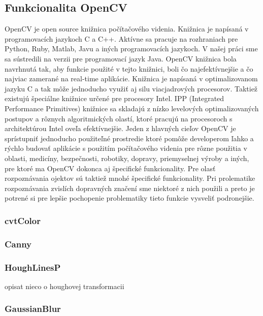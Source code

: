 \documentclass[12pt]{article}
\begin{document}
\subsection{Funkcionalita OpenCV}
OpenCV je open source knižnica počítačového videnia. Knižnica je napísaná v programovacích jazykoch C a C++. Aktívne sa pracuje na
rozhraniach pre Python, Ruby, Matlab, Javu a iných programovacích jazykoch. V našej práci sme sa sústredili na verzii pre programovací jazyk Java.
\cite{learning_opencv}
\linebreak
\linebreak
OpenCV knižnica bola navrhnutá tak, aby funkcie použité v tejto knižnici, boli čo najefektívnejšie a čo najviac zamerané na real-time aplikácie.
Knižnica je napísaná v optimalizovanom jazyku C a tak môže jednoducho využiť aj silu viacjadrových procesorov.
Taktiež existujú špeciálne knižnice určené pre procesory Intel. IPP (Integrated Performance Primitives) knižnice  sa skladajú z nízko levelových 
optimalizovaných postupov a rôznych algoritmických olastí, ktoré pracujú na procesoroch s architektúrou Intel oveľa efektívnejšie.
\cite{learning_opencv}
\linebreak
\linebreak
Jeden z hlavných cieľov OpenCV je sprístupniť jednoducho použiteľné prostredie ktoré pomôže developerom ľahko a rýchlo budovať aplikácie s použitím počítačového videnia
pre rôzne použitia v oblasti, medicíny, bezpečnosti, robotiky, dopravy, priemyselnej výroby a iných, pre ktoré ma OpenCV dokonca aj špecifické funkcionality.
\cite{learning_opencv}
\linebreak
\linebreak
Pre olasť rozpoznávania ojektov sú taktiež mnohé špecifické funkcionality.
Pri prolematike rozpoznávania zvislích dopravných značení sme niektoré z nich použili a preto je potrené si pre lepšie pochopenie problematiky tieto funkcie vysveliť podronejšie.
\subsubsection{cvtColor}
\subsubsection{Canny}
\subsubsection{HoughLinesP}
opisat nieco o houghovej transformacii
\subsubsection{GaussianBlur}
\end{document}
